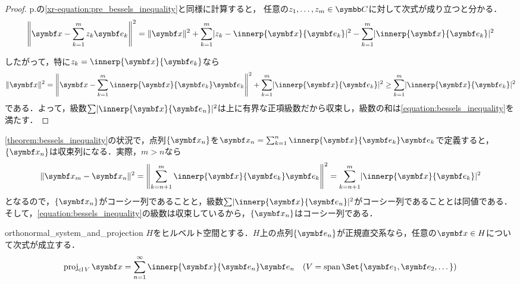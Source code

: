 \documentclass[../../main]{subfiles}
\begin{document}
\begin{proof}
  p.\pageref{xr-equation:pre_bessels_inequality}の\cref{xr-equation:pre_bessels_inequality}と同様に計算すると，
  任意の\(z_1,\dots,z_m\in\numset{C}\)に対して次式が成り立つと分かる．
  \[
    \vnorm*{\vect{x}-\sum_{k=1}^mz_k\vect{e}_k}^2 = \vnorm{\vect{x}}^2+\sum_{k=1}^m\abs{z_k-\innerp{\vect{x}}{\vect{e}_k}}^2-\sum_{k=1}^m\abs{\innerp{\vect{x}}{\vect{e}_k}}^2
  \]

  したがって，特に\(z_k=\innerp{\vect{x}}{\vect{e}_k}\)なら
  \[
    \vnorm{\vect{x}}^2 = \vnorm*{\vect{x}-\sum_{k=1}^m\innerp{\vect{x}}{\vect{e}_k}\vect{e}_k}^2+\sum_{k=1}^m\abs{\innerp{\vect{x}}{\vect{e}_k}}^2
    \geq \sum_{k=1}^m\abs{\innerp{\vect{x}}{\vect{e}_k}}^2
  \]
  である．よって，級数\(\sum\abs{\innerp{\vect{x}}{\vect{e}_n}}^2\)は上に有界な正項級数だから収束し，級数の和は\cref{equation:bessels_inequality}を満たす．
\end{proof}

\cref{theorem:bessels_inequality}の状況で，点列\(\seq{\vect{x}_n}\)を\(\vect{x}_n=\sum_{k=1}^n\innerp{\vect{x}}{\vect{e}_k}\vect{e}_k\)で定義すると，
\(\seq{\vect{x}_n}\)は収束列になる．実際，\(m>n\)なら
\[
  \vnorm{\vect{x}_m-\vect{x}_n}^2 = \vnorm*{\sum_{k=n+1}^m\innerp{\vect{x}}{\vect{e}_k}\vect{e}_k}^2
  = \sum_{k=n+1}^m\abs{\innerp{\vect{x}}{\vect{e}_k}}^2
\]
となるので，\(\seq{\vect{x}_n}\)がコーシー列であることと，級数\(\sum\abs{\innerp{\vect{x}}{\vect{e}_n}}^2\)がコーシー列であることとは同値である．
そして，\cref{equation:bessels_inequality}の級数は収束しているから，\(\seq{\vect{x}_n}\)はコーシー列である．

\begin{proposition}{}{orthonormal_system_and_projection}
  \(H\)をヒルベルト空間とする．\(H\)上の点列\(\seq{\vect{e}_n}\)が正規直交系なら，任意の\(\vect{x}\in H\)について次式が成立する．
  \[
    \proj_{\clsr V}\vect{x} = \sum_{n=1}^\infty\innerp{\vect{x}}{\vect{e}_n}\vect{e}_n
    \quad(V=\spannedby\Set{\vect{e}_1,\vect{e}_2,\dotsc})
  \]
\end{proposition}
\end{document}
